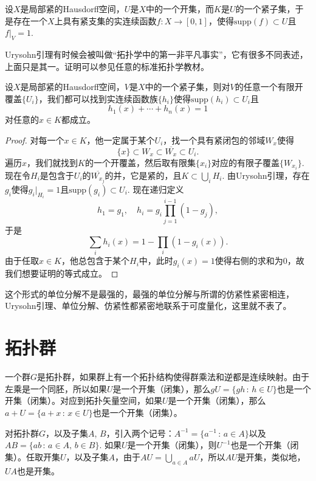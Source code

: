 \begin{thm}[Urysohn引理]
设$X$是局部紧的Hausdorff空间，$U$是$X$中的一个开集，而$K$是$U$的一个紧子集，于是存在一个$X$上具有紧支集的实连续函数$f:X\to [0,1]$，使得$\mathrm{supp}(f)\subset U$且$f|_V=1$.
\end{thm}

Urysohn引理有时候会被叫做“拓扑学中的第一非平凡事实”，它有很多不同表述，上面只是其一。证明可以参见任意的标准拓扑学教材。

\begin{pro}[单位分解]
设$X$是局部紧的Hausdorff空间，$V$是$X$中的一个紧子集，则对$V$的任意一个有限开覆盖$\{U_i\}$，我们都可以找到实连续函数族$\{h_i\}$使得$\mathrm{supp}(h_i)\subset U_i$且
\[
	h_1(x)+\cdots+h_n(x)=1
\]
对任意的$x\in K$都成立。
\end{pro}

\begin{proof}
对每一个$x\in K$，他一定属于某个$U_i$，找一个具有紧闭包的邻域$W_x$使得
\[
	\{x\}\subset W_x \subset \overline{W_x}\subset U_i.
\]
遍历$x$，我们就找到$K$的一个开覆盖，然后取有限集$\{x_i\}$对应的有限子覆盖$\{W_{x_i}\}$. 现在令$H_i$是包含于$U_i$的$\overline{W_{x_j}}$的并，它是紧的，且$K\subset \bigcup_i H_i$. 由Urysohn引理，存在$g_i$使得$g_i|_{H_i}=1$且$\mathrm{supp}(g_i)\subset U_i$. 现在递归定义
\[
	h_1=g_1,\quad h_i=g_i\prod_{j=1}^{i-1}(1-g_j),
\]
于是
\[
	\sum_i h_i(x)=1-\prod_i(1-g_i(x)).
\]
由于任取$x\in K$，他总包含于某个$H_i$中，此时$g_i(x)=1$使得右侧的求和为$0$，故我们想要证明的等式成立。
\end{proof}

这个形式的单位分解不是最强的，最强的单位分解与所谓的仿紧性紧密相连，Urysohn引理、单位分解、仿紧性都紧密地联系于可度量化，这里就不表了。

\section{拓扑群}

一个群$G$是拓扑群，如果群上有一个拓扑结构使得群乘法和逆都是连续映射。由于左乘是一个同胚，所以如果$U$是一个开集（闭集），那么$gU=\{gh\,:\,h\in U\}$也是一个开集（闭集）。对应到拓扑矢量空间，如果$U$是一个开集（闭集），那么$a+U=\{a+x\,:\,x\in U\}$也是一个开集（闭集）。

对拓扑群$G$，以及子集$A$, $B$，引入两个记号：$A^{-1}=\{a^{-1}\,:\,a\in A\}$以及$AB=\{ab\,:\,a\in A,\, b\in B\}$. 如果$U$是一个开集（闭集），则$U^{-1}$也是一个开集（闭集）。任取开集$U$，以及子集$A$，由于$AU=\bigcup_{a\in A}aU$，所以$AU$是开集，类似地，$UA$也是开集。

